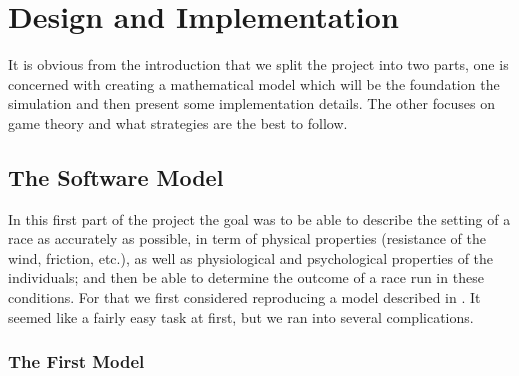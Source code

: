 \documentclass[10pt, a4paper]{report}
\begin{document}
\chapter{Design and Implementation}\label{ch:design&impl}


It is obvious from the introduction that we split the project into two parts, one is concerned with creating a mathematical model which will be the foundation the simulation and then present some implementation details. The other focuses on game theory and what strategies are the best to follow.

\section{The Software Model}\label{sec:softmodel}

In this first part of the project the goal was to be able to describe the setting of a race as accurately as possible, in term of physical properties (resistance of the wind, friction, etc.), as well as physiological and psychological properties of the individuals; and then be able to determine the outcome of a race run in these conditions. For that we first considered reproducing a model described in \cite{AgentModel}. It seemed like a fairly easy task at first, but we ran into several complications.

\subsection{The First Model}\label{subsec:model1}
\end{document}

